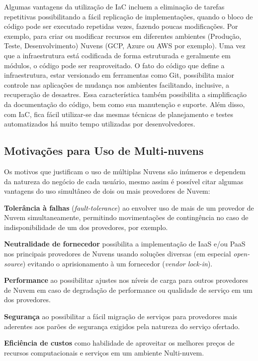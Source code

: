 \documentclass[12pt]{article}
\begin{document}
	Algumas vantagens da utilização de IaC incluem a eliminação de tarefas repetitivas possibilitando a fácil replicação de implementações, quando o bloco de código pode ser executado repetidas vezes, fazendo poucas modificações. Por exemplo, para criar ou modificar recursos em diferentes ambientes (Produção, Teste, Desenvolvimento) Nuvens (GCP, Azure ou AWS por exemplo). Uma vez que a infraestrutura  está codificada de forma estruturada e geralmente em módulos, o código pode ser reaproveitado. O fato do código que define a infraestrutura, estar versionado em ferramentas como Git, possibilita maior controle nas aplicações de mudança nos ambientes facilitando, inclusive, a recuperação de desastres. Essa característica também possibilita a simplificação da documentação do código, bem como sua manutenção e suporte. Além disso, com IaC, fica fácil utilizar-se das mesmas técnicas de planejamento e testes automatizados há muito tempo utilizadas por desenvolvedores.	
	
	\subsection{Motivações para Uso de Multi-nuvens}
	
	Os motivos que justificam o uso de múltiplas Nuvens são inúmeros e dependem da natureza do negócio de cada usuário, mesmo assim é possível citar algumas vantagens do uso simultâneo de dois ou mais provedores de Nuvem:
	
	\textbf{Tolerância à falhas} (\textit{fault-tolerance}) ao envolver uso de mais de um provedor de Nuvem simultaneamente, permitindo movimentações de contingência no caso de indisponibilidade de um dos provedores, por exemplo.
	
	\textbf{Neutralidade de fornecedor} possibilita a implementação de IaaS e/ou PaaS nos principais provedores de Nuvens usando soluções diversas (em especial \textit{open-source}) evitando o aprisionamento à um fornecedor (\textit{vendor lock-in}).
	
	\textbf{Performance} ao possibilitar ajustes nos níveis de carga para outros provedores de Nuvem em caso de degradação de performance ou qualidade de serviço em um dos provedores.
	
	\textbf{Segurança} ao possibilitar a fácil migração de serviços para provedores mais aderentes aos parões de segurança exigidos pela natureza do serviço ofertado.
	
	\textbf{Eficiência de custos} como habilidade de aproveitar os melhores preços de recursos computacionais e serviços em um ambiente Nulti-nuvem.
	
\end{document}
